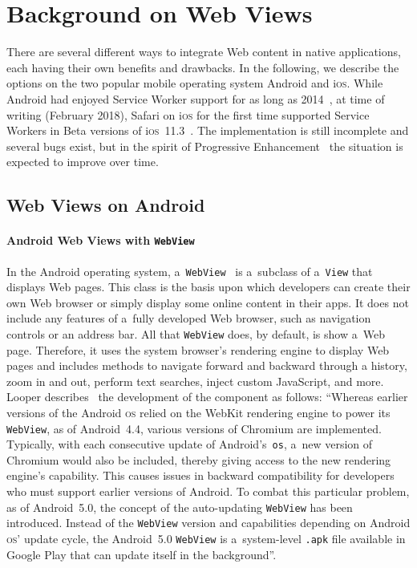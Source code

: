 \documentclass[sigconf]{acmart}
\begin{document}
\section{Background on Web Views}
\label{sec:background}

There are several different ways to integrate Web content in native applications,
each having their own benefits and drawbacks.
In the following, we describe the options on the two popular
mobile operating system Android and i\textsc{os}.
While Android had enjoyed Service Worker support for as long as 2014~\cite{cooney2014chromium},
at time of writing (February 2018), Safari on i\textsc{os}
for the first time supported Service Workers
in Beta versions of i\textsc{os}~11.3~\cite{mondello2018safari}.
The implementation is still incomplete and several bugs exist, but in the spirit of
Progressive Enhancement~\cite{champeon2003progressiveenhancement}
the situation is expected to improve over time.

\subsection{Web Views on Android}

\paragraph{Android Web Views with \texttt{WebView}}

In the Android operating system, a~\texttt{WebView}~\cite{android2018webview}
is a~subclass of a~\texttt{View} that displays Web pages.
This class is the basis upon which developers can create their own Web browser
or simply display some online content in their apps.
It does not include any features of a~fully developed Web browser,
such as navigation controls or an address bar.
All that \texttt{WebView} does, by default, is show a~Web page.
Therefore, it uses the system browser's rendering engine to display Web pages
and includes methods to navigate forward and backward through a history,
zoom in and out, perform text searches, inject custom JavaScript, and more.
Looper describes~\cite{looper2015webviews}
the development of the component as follows:
``Whereas earlier versions of the Android \textsc{os}
relied on the WebKit rendering engine to power its \texttt{WebView},
as of Android~4.4, various versions of Chromium are implemented.
Typically, with each consecutive update of Android's~\texttt{os},
a~new version of Chromium would also be included, thereby giving access
to the new rendering engine's capability.
This causes issues in backward compatibility for developers
who must support earlier versions of Android.
To combat this particular problem, as of Android~5.0,
the concept of the auto-updating \texttt{WebView} has been introduced.
Instead of the \texttt{WebView} version and capabilities
depending on Android \textsc{os}' update cycle,
the Android~5.0 \texttt{WebView} is a~system-level \texttt{.apk} file
available in Google Play that can update itself in the background''.
\end{document}
